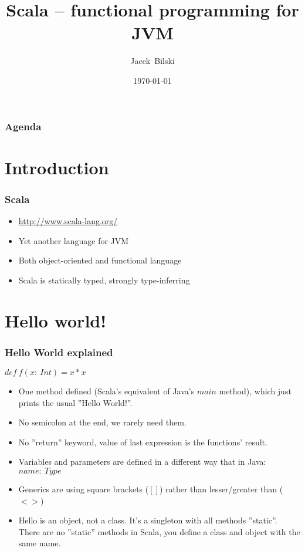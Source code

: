 \documentclass[xcolor=dvipsnames]{beamer}
\title{Scala -- functional programming for JVM}
\author{Jacek~Bilski}
\date{\today}
\begin{document}
\begin{frame}
\titlepage
\end{frame}

\begin{frame}
\frametitle{Agenda}
\tableofcontents[pausesections]
\end{frame}

\section{Introduction}

\begin{frame}
\frametitle{Scala}
\begin{itemize}
\item \href{http://www.scala-lang.org/}{http://www.scala-lang.org/}
\item Yet another language for JVM
\item Both object-oriented and functional language
\item Scala is statically typed, strongly type-inferring
\end{itemize}
\end{frame}

\section{Hello world!}


\begin{frame}
\frametitle{Hello World explained}
$def\:f(x:\:Int) = x * x$
\begin{itemize}
\item One method defined (Scala's equivalent of Java's $main$ method), which just prints the usual ''Hello World!''.
\item No semicolon at the end, we rarely need them.
\item No ''return'' keyword, value of last expression is the functions' result.
\item Variables and parameters are defined in a different way that in Java: $name:\:Type$
\item Generics are using square brackets ($[]$) rather than lesser/greater than ($<>$)
\item Hello is an object, not a class. It's a singleton with all methods ''static''. There are no ''static'' methods in Scala, you define a class and object with the same name.
\end{itemize}
\end{frame}
\end{document}

